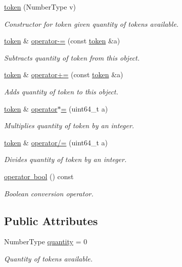 \begin{DoxyCompactItemize}
\mbox{\hyperlink{classaacio_1_1token_aca7b79f6470d073a59a63deb5057b69c}{token}} (Number\+Type v)
\begin{DoxyCompactList}\small\item\em Constructor for token given quantity of tokens available. \end{DoxyCompactList}\item 
\mbox{\hyperlink{classaacio_1_1token}{token}} \& \mbox{\hyperlink{classaacio_1_1token_ad5f3b69a9f5cfc057719e9a83e835be6}{operator-\/=}} (const \mbox{\hyperlink{classaacio_1_1token}{token}} \&a)
\begin{DoxyCompactList}\small\item\em Subtracts quantity of token from this object. \end{DoxyCompactList}\item 
\mbox{\hyperlink{classaacio_1_1token}{token}} \& \mbox{\hyperlink{classaacio_1_1token_a17e4db907dda222b2f0678e264a1616d}{operator+=}} (const \mbox{\hyperlink{classaacio_1_1token}{token}} \&a)
\begin{DoxyCompactList}\small\item\em Adds quantity of token to this object. \end{DoxyCompactList}\item 
\mbox{\hyperlink{classaacio_1_1token}{token}} \& \mbox{\hyperlink{classaacio_1_1token_a89ed694ad8844dda040264fd115a8d05}{operator$\ast$=}} (uint64\+\_\+t a)
\begin{DoxyCompactList}\small\item\em Multiplies quantity of token by an integer. \end{DoxyCompactList}\item 
\mbox{\hyperlink{classaacio_1_1token}{token}} \& \mbox{\hyperlink{classaacio_1_1token_ab6185d9d3dbb0d3e86cf4200f5fc6bf0}{operator/=}} (uint64\+\_\+t a)
\begin{DoxyCompactList}\small\item\em Divides quantity of token by an integer. \end{DoxyCompactList}\item 
\mbox{\hyperlink{classaacio_1_1token_a0017cdc9c0fe40daa00f695612e1d576}{operator bool}} () const
\begin{DoxyCompactList}\small\item\em Boolean conversion operator. \end{DoxyCompactList}\end{DoxyCompactItemize}
\subsection*{Public Attributes}
\begin{DoxyCompactItemize}
\item 
Number\+Type \mbox{\hyperlink{classaacio_1_1token_ab2c38b947ea6525e8a61c3b9cd4e711d}{quantity}} = 0
\begin{DoxyCompactList}\small\item\em Quantity of tokens available. \end{DoxyCompactList}\end{DoxyCompactItemize}
